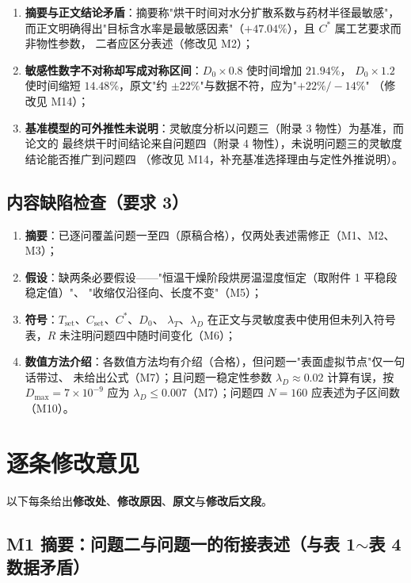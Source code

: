 \documentclass[UTF8,zihao=-4]{ctexart}
\begin{document}
\begin{enumerate}
\item \textbf{摘要与正文结论矛盾}：摘要称"烘干时间对水分扩散系数与药材半径最敏感"，
而正文明确得出"目标含水率是最敏感因素"（$+47.04\%$），且 $C^{*}$ 属工艺要求而非物性参数，
二者应区分表述（修改见 M2）；
\item \textbf{敏感性数字不对称却写成对称区间}：$D_0\times0.8$ 使时间增加 $21.94\%$，
$D_0\times1.2$ 使时间缩短 $14.48\%$，原文"约 $\pm22\%$"与数据不符，应为"$+22\%/-14\%$"
（修改见 M14）；
\item \textbf{基准模型的可外推性未说明}：灵敏度分析以问题三（附录 3 物性）为基准，而论文的
最终烘干时间结论来自问题四（附录 4 物性），未说明问题三的灵敏度结论能否推广到问题四
（修改见 M14，补充基准选择理由与定性外推说明）。
\end{enumerate}

\subsection{内容缺陷检查（要求 3）}

\begin{enumerate}
\item \textbf{摘要}：已逐问覆盖问题一至四（原稿合格），仅两处表述需修正（M1、M2、M3）；
\item \textbf{假设}：缺两条必要假设——"恒温干燥阶段烘房温湿度恒定（取附件 1 平稳段稳定值）"、
"收缩仅沿径向、长度不变"（M5）；
\item \textbf{符号}：$T_{\mathrm{set}}$、$C_{\mathrm{set}}$、$C^{*}$、$D_0$、
$\lambda_T$、$\lambda_D$ 在正文与灵敏度表中使用但未列入符号表，$R$ 未注明问题四中随时间变化（M6）；
\item \textbf{数值方法介绍}：各数值方法均有介绍（合格），但问题一"表面虚拟节点"仅一句话带过、
未给出公式（M7）；且问题一稳定性参数 $\lambda_D\approx0.02$ 计算有误，按 $D_{\max}=7\times10^{-9}$
应为 $\lambda_D\le0.007$（M7）；问题四 $N=160$ 应表述为子区间数（M10）。
\end{enumerate}

\section{逐条修改意见}

以下每条给出\textbf{修改处}、\textbf{修改原因}、\textbf{原文}与\textbf{修改后文段}。

\subsection*{M1 摘要：问题二与问题一的衔接表述（与表 1$\sim$表 4 数据矛盾）}
\end{document}
